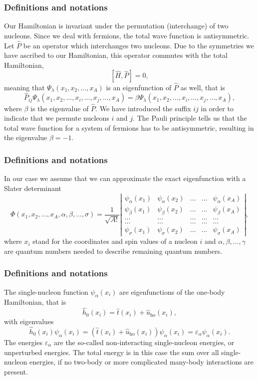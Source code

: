 \documentclass[compress]{beamer}
\newcommand{\be}{\begin{equation}}
\newcommand{\ee}{\end{equation}}
\begin{document}
\frame
{
  \frametitle{Definitions and notations}
\begin{small}
{\scriptsize
Our Hamiltonian is invariant under the permutation (interchange) of two nucleons. %
Since we deal with fermions, the total wave function is antisymmetric.
Let $\hat{P}$ be an operator which interchanges two nucleons.
Due to the symmetries we have ascribed to our Hamiltonian, this operator commutes with the total Hamiltonian,
\[
[\hat{H},\hat{P}] = 0,
\]
meaning that $\Psi_{\lambda}(x_1, x_2, \dots , x_A)$ is an eigenfunction of 
$\hat{P}$ as well, that is
\[
\hat{P}_{ij}\Psi_{\lambda}(x_1, x_2, \dots,x_i,\dots,x_j,\dots,x_A)=
\beta\Psi_{\lambda}(x_1, x_2, \dots,x_i,\dots,x_j,\dots,x_A),
\]
where $\beta$ is the eigenvalue of $\hat{P}$. We have introduced the suffix $ij$ in order to indicate that we permute nucleons $i$ and $j$.
The Pauli principle tells us that the total wave function for a system of fermions
has to be antisymmetric, resulting in the eigenvalue $\beta = -1$.   
}
\end{small}
}

\frame
{
  \frametitle{Definitions and notations}
\begin{small}
{\scriptsize
In our case we assume that  we can approximate the exact eigenfunction with a Slater determinant
\be
   \Phi(x_1, x_2,\dots ,x_A,\alpha,\beta,\dots, \sigma)=\frac{1}{\sqrt{A!}}
\left| \begin{array}{ccccc} \psi_{\alpha}(x_1)& \psi_{\alpha}(x_2)& \dots & \dots & \psi_{\alpha}(x_A)\\
                            \psi_{\beta}(x_1)&\psi_{\beta}(x_2)& \dots & \dots & \psi_{\beta}(x_A)\\  
                            \dots & \dots & \dots & \dots & \dots \\
                            \dots & \dots & \dots & \dots & \dots \\
                     \psi_{\sigma}(x_1)&\psi_{\sigma}(x_2)& \dots & \dots & \psi_{\sigma}(x_A)\end{array} \right|, 
\label{HartreeFockDet}
\ee 
where  $x_i$  stand for the coordinates and spin values of a nucleon $i$ and $\alpha,\beta,\dots, \gamma$ 
are quantum numbers needed to describe remaining quantum numbers.  
}
\end{small}
}

\frame
{
  \frametitle{Definitions and notations}
\begin{small}
{\scriptsize
The single-nucleon function $\psi_{\alpha}(x_i)$  are eigenfunctions of the one-body
Hamiltonian, that is
\[
\hat{h}_0(x_i)=\hat{t}(x_i) + \hat{u}_{\mathrm{ho}}(x_i),
\]
with eigenvalues 
\[
\hat{h}_0(x_i) \psi_{\alpha}(x_i)=\left(\hat{t}(x_i) + \hat{u}_{\mathrm{ho}}(x_i)\right)\psi_{\alpha}(x_i)=\varepsilon_{\alpha}\psi_{\alpha}(x_i).
\]
The energies $\varepsilon_{\alpha}$ are the so-called non-interacting single-nucleon energies, or unperturbed energies. 
The total energy is in this case the sum over all  single-nucleon energies, if no two-body or more complicated
many-body interactions are present.
}
\end{small}
}
\end{document}
